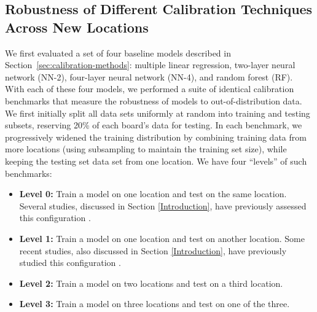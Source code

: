 \documentclass[journal abbreviation, manuscript]{copernicus}
\begin{document}
\subsection{Robustness of Different Calibration Techniques Across New Locations}
We first evaluated a set of four baseline models described in Section~\ref{sec:calibration-methods}: multiple linear regression, two-layer neural network (NN-2), four-layer neural network (NN-4), and random forest (RF). With each of these four models, we performed a suite of identical calibration benchmarks that measure the robustness of models to out-of-distribution data. We first initially split all data sets uniformly at random into training and testing subsets, reserving 20\% of each board's data for testing.  In each benchmark, we progressively widened the training distribution by combining training data from more locations (using subsampling to maintain the training set size), while keeping the testing set data set from one location.  We have four ``levels'' of such benchmarks:
\begin{itemize}
    \item \textbf{Level 0:} Train a model on one location and test on the same location.  Several studies, discussed in Section \ref{Introduction}, have previously assessed this configuration \citep{Zimmerman2018,Spinelle2015,SPINELLE2017706,Cross2017}.
    \item \textbf{Level 1:} Train a model on one location and test on another location.  Some recent studies, also discussed in Section \ref{Introduction}, have previously studied this configuration \citep{Hagan2018, Casey2018testing, Malings2018development,Bigi2018performance}.
    \item \textbf{Level 2:} Train a model on two locations and test on a third location.
    \item \textbf{Level 3:} Train a model on three locations and test on one of the three.
\end{itemize}
\end{document}
